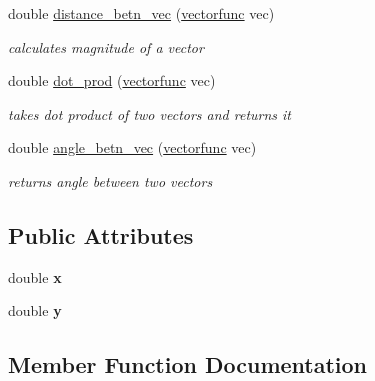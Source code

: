 \begin{DoxyCompactItemize}
double \mbox{\hyperlink{classvectorfunc_a0d773a2e884277629e55d5e3deb94106}{distance\+\_\+betn\+\_\+vec}} (\mbox{\hyperlink{classvectorfunc}{vectorfunc}} vec)
\begin{DoxyCompactList}\small\item\em calculates magnitude of a vector \end{DoxyCompactList}\item 
\mbox{\label{classvectorfunc_af8fa2f110160aad200e5ff6009a46c9e}} 
double \mbox{\hyperlink{classvectorfunc_af8fa2f110160aad200e5ff6009a46c9e}{dot\+\_\+prod}} (\mbox{\hyperlink{classvectorfunc}{vectorfunc}} vec)
\begin{DoxyCompactList}\small\item\em takes dot product of two vectors and returns it \end{DoxyCompactList}\item 
double \mbox{\hyperlink{classvectorfunc_a0ea33bae1a0f2cc319cbfd26460e35d4}{angle\+\_\+betn\+\_\+vec}} (\mbox{\hyperlink{classvectorfunc}{vectorfunc}} vec)
\begin{DoxyCompactList}\small\item\em returns angle between two vectors \end{DoxyCompactList}\end{DoxyCompactItemize}
\subsection*{Public Attributes}
\begin{DoxyCompactItemize}
\item 
\mbox{\label{classvectorfunc_a1903d875fdafb80b8a518c0afadf85a3}} 
double {\bfseries x}
\item 
\mbox{\label{classvectorfunc_a70ceaa93e103ec31b5104a859daa2266}} 
double {\bfseries y}
\end{DoxyCompactItemize}


\subsection{Member Function Documentation}
\mbox{\label{classvectorfunc_a0ea33bae1a0f2cc319cbfd26460e35d4}} 
